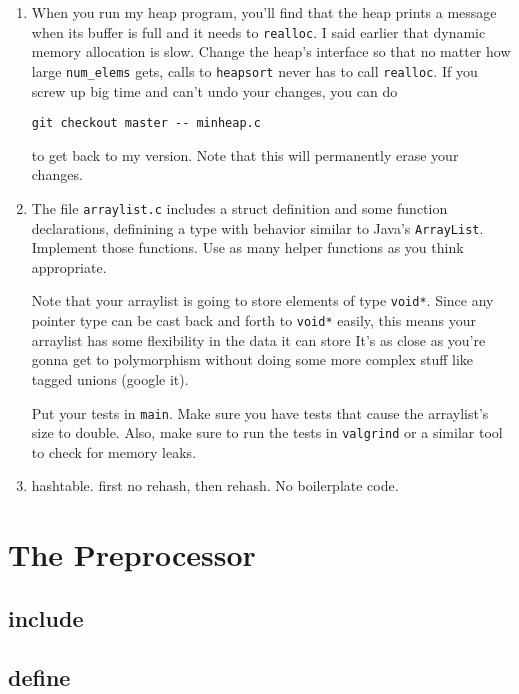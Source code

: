 \documentclass[ebook,11pt,oneside,openany]{memoir}
\newcommand{\cf}[1]{\texttt{#1}}
\begin{document}
\begin{enumerate}

\item When you run my heap program, you'll find that the heap prints a message when its buffer is full and it needs to \cf{realloc}. I said earlier that dynamic memory allocation is slow. Change the heap's interface so that no matter how large \cf{num\_elems} gets, calls to \cf{heapsort} never has to call \cf{realloc}. If you screw up big time and can't undo your changes, you can do

\begin{verbatim}
git checkout master -- minheap.c
\end{verbatim}

\noindent
to get back to my version. Note that this will permanently erase your changes.

\item The file \cf{arraylist.c} includes a struct definition and some function declarations, definining a type with behavior similar to Java's \cf{ArrayList}. Implement those functions. Use as many helper functions as you think appropriate.

Note that your arraylist is going to store elements of type \cf{void*}. Since any pointer type can be cast back and forth to \cf{void*} easily, this means your arraylist has some flexibility in the data it can store It's as close as you're gonna get to polymorphism without doing some more complex stuff like tagged unions (google it).

Put your tests in \cf{main}. Make sure you have tests that cause the arraylist's size to double. Also, make sure to run the tests in \cf{valgrind} or a similar tool to check for memory leaks.

\item hashtable. first no rehash, then rehash. No boilerplate code.

\end{enumerate}


\chapter{The Preprocessor}
\label{ch:pre}
\section{include}
\section{define}
\end{document}
